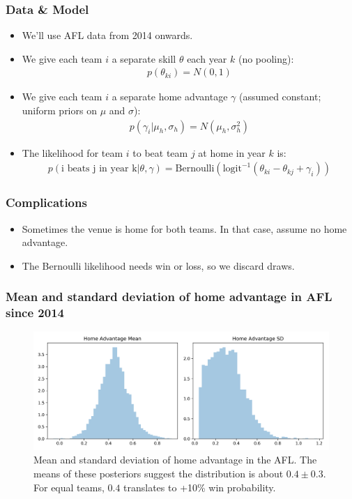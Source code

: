\documentclass{beamer}
\begin{document}
\begin{frame}
\frametitle{Data \& Model}
\begin{itemize}
	\item We'll use AFL data from 2014 onwards.
	\item We give each team $i$ a separate skill $\theta$ each year $k$ (no pooling):
	\begin{align*}
		p(\theta_{ki}) = N(0, 1)
	\end{align*}
	\item We give each team $i$ a separate home advantage $\gamma$ (assumed constant; uniform priors on $\mu$ and $\sigma$):
	\begin{align*}
		p(\gamma_i | \mu_h, \sigma_h) = N(\mu_h, \sigma_h^2)
	\end{align*}
	\item The likelihood for team $i$ to beat team $j$ at home in year $k$ is:
	\begin{align*}
		p(\textrm{i beats j in year k}|\theta, \gamma) = \textrm{Bernoulli}(\textrm{logit}^{-1}(\theta_{ki} - \theta_{kj} + \gamma_i))
	\end{align*}
\end{itemize}
\end{frame}

\begin{frame}
	\frametitle{Complications}
	\begin{itemize}
		\item Sometimes the venue is home for both teams. In that case, assume no home advantage.
		\item The Bernoulli likelihood needs win or loss, so we discard draws.
	\end{itemize}
\end{frame}

\begin{frame}
\frametitle{Mean and standard deviation of home advantage in AFL since 2014}
\begin{figure}
	\includegraphics[width=\textwidth]{mean_var_home_ad}	
	\caption{Mean and standard deviation of home advantage in the AFL. The means of these posteriors suggest the distribution is about $0.4 \pm 0.3$. For equal teams, $0.4$ translates to +10\% win probability.}
\end{figure}
\end{frame}
\end{document}
